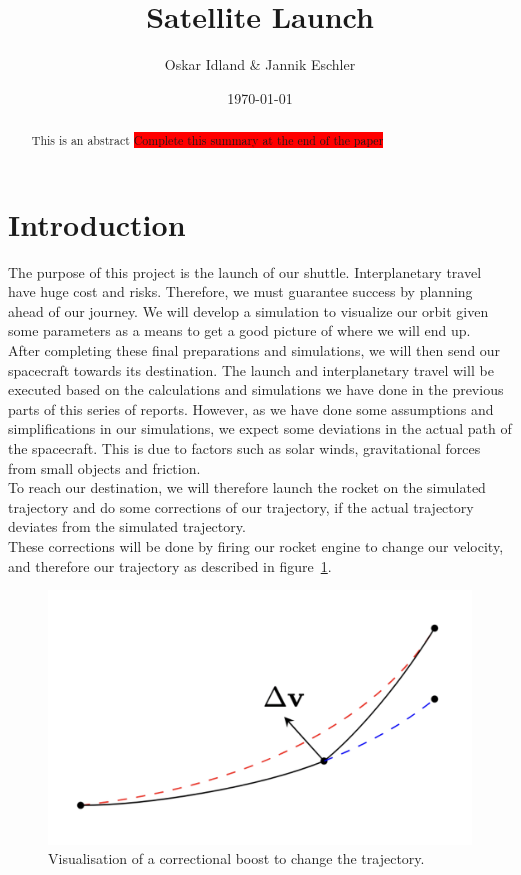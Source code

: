\documentclass[reprint,english,notitlepage]{revtex4-2}
\begin{document}
\title{Satellite Launch}
\author{Oskar Idland \& Jannik Eschler}
\date{\today}

\begin{abstract}
    This is an abstract \colorbox{red}{Complete this summary at the end of the paper}
\end{abstract}
\maketitle

\section{Introduction} \label{sec:introduction}
The purpose of this project is the launch of our shuttle.
Interplanetary travel have huge cost and risks.
Therefore, we must guarantee success by planning ahead of our journey.
We will develop a simulation to visualize our orbit given some parameters as a means to get a good picture of where we will end up.\\

After completing these final preparations and simulations, we will then send our spacecraft towards its destination.
The launch and interplanetary travel will be executed based on the calculations and simulations we have done in the previous parts of this series of reports.
However, as we have done some assumptions and simplifications in our simulations, we expect some deviations in the actual path of the spacecraft.
This is due to factors such as solar winds, gravitational forces from small objects and friction.\\
To reach our destination, we will therefore launch the rocket on the simulated trajectory and do some corrections of our trajectory, if the actual trajectory deviates from the simulated trajectory.\\
These corrections will be done by firing our rocket engine to change our velocity, and therefore our trajectory as described in figure~\ref{fig:boost_fig}.

\begin{figure}[h]
    \centering
    \includegraphics[scale=0.12]{Figures/boost_fig}
    \caption{Visualisation of a correctional boost to change the trajectory.}\label{fig:boost_fig}
\end{figure}
\end{document}
